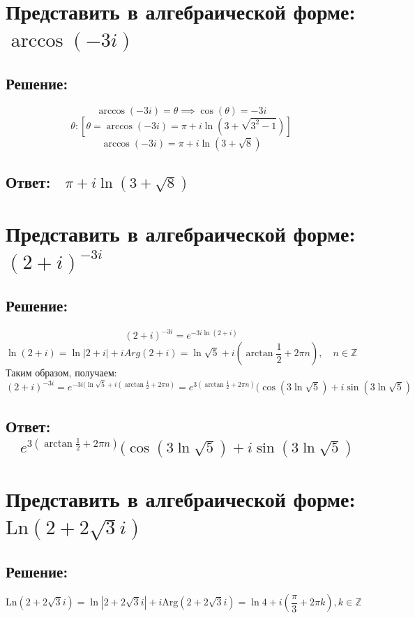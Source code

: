 \documentclass{article}
\begin{document}
        \section{Представить в алгебраической форме: $\arccos(-3i)$}
        \subsection{Решение:}
        $$\arccos(-3i) = \theta \implies \cos(\theta) = -3i$$ 
        $$\theta: [\theta = \arccos(-3i) = \pi + i \ln(3 + \sqrt{3^2 - 1})]$$
        $$\arccos(-3i) = \pi + i \ln(3 + \sqrt{8})$$
	
	\subsection{Ответ:$\quad \pi + i \ln(3 + \sqrt{8})$}

        \section{Представить в алгебраической форме: $(2 + i)^{-3i}$}
	\subsection{Решение:}
	$$(2 + i)^{-3i} = e^{-3i\ln(2 + i)}$$
        $$\ln(2 + i) = \ln{|2 + i|} + iArg(2 + i) = \ln{\sqrt{5}} + i(\arctan{\frac{1}{2}} + 2\pi n),\quad n \in \mathbb{Z} $$ 
        Таким образом, получаем: \\
         $$(2 + i)^{-3i} = e^{-3i(\ln{\sqrt{5}} + i(\arctan{\frac{1}{2}} + 2\pi n)} = e^{3(\arctan{\frac{1}{2}} +  2\pi n)} (\cos(3\ln{\sqrt{5}}) + i\sin(3\ln{\sqrt{5}})$$
	\subsection{Ответ:$\quad e^{3(\arctan{\frac{1}{2}} +  2\pi n)} (\cos(3\ln{\sqrt{5}}) + i\sin(3\ln{\sqrt{5}})$}

        \section{Представить в алгебраической форме: $\text{Ln}(2+2\sqrt{3}i)$}
	\subsection{Решение:}
	\[\text{Ln}(2+2\sqrt{3}i) = \ln|2 + 2\sqrt{3}i| + i\text{Arg}(2+2\sqrt{3}i) = \ln 4 + i\left(\frac{\pi}{3} + 2\pi k\right), k \in \mathbb{Z}\]
\end{document}
